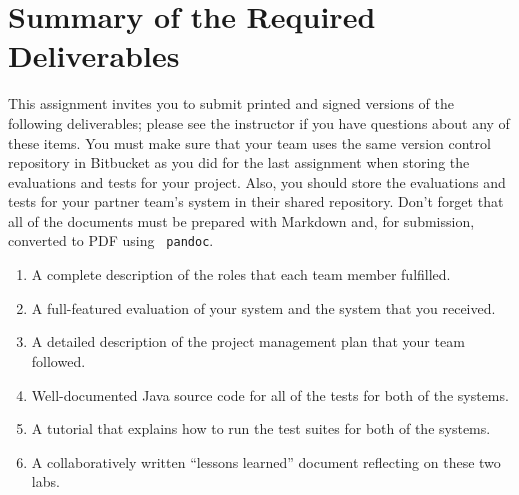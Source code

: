 

\section*{Summary of the Required Deliverables}

This assignment invites you to submit printed and signed versions of the following deliverables; please see the
instructor if you have questions about any of these items. You must make sure that your team uses the same version
control repository in Bitbucket as you did for the last assignment when storing the evaluations and tests for your
project.  Also, you should store the evaluations and tests for your partner team's system in their shared repository.
Don't forget that all of the documents must be prepared with Markdown and, for submission, converted to PDF using {\tt
pandoc}.

\vspace*{-.1in}
\begin{enumerate}
  \setlength{\itemsep}{0in}
  \item A complete description of the roles that each team member fulfilled.
  \item A full-featured evaluation of your system and the system that you received.
  \item A detailed description of the project management plan that your team followed.
  \item Well-documented Java source code for all of the tests for both of the systems.
  \item A tutorial that explains how to run the test suites for both of the systems.
  \item A collaboratively written ``lessons learned'' document reflecting on these two labs.
\end{enumerate}
\vspace*{-.1in}


